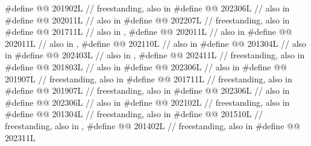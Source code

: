 \begin{codeblock}
#define @@                             201902L // freestanding, also in 
#define @@          202306L // also in 
#define @@                        202011L // also in 
#define @@                 202207L // freestanding, also in 
#define @@                  201711L // also in , 
#define @@                       202011L // also in 
#define @@                   202011L // also in , 
#define @@       202110L // also in 
#define @@                       201304L // also in 
#define @@                       202403L // also in , 
#define @@                         202411L // freestanding, also in 
#define @@                           201803L // also in 
#define @@                     202306L // also in 
#define @@              201907L // freestanding, also in 
#define @@                        201711L // freestanding, also in 
#define @@                          201907L // freestanding, also in 
#define @@                          202306L // also in 
#define @@                         202306L // also in 
#define @@                     202102L // freestanding, also in 
#define @@      201304L // freestanding, also in 
#define @@             201510L
  // freestanding, also in , 
#define @@                   201402L // freestanding, also in 
#define @@                        202311L

\end{codeblock}
